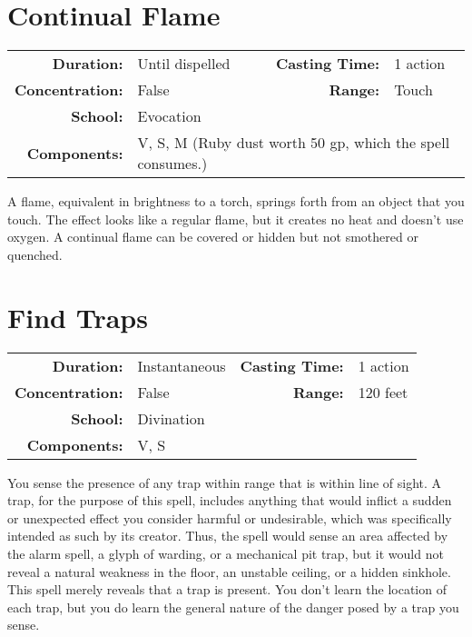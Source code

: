 \documentclass[a5paper, 12pt]{memoir}
\begin{document}
\newpage
\section*{Continual Flame}

{
\small\centering\vspace{-6pt}
\begin{tabular}{rlrl}
\toprule

\textbf{Duration:} & Until dispelled &
\textbf{Casting Time:} & 1 action \\
\textbf{Concentration:} & False &
\textbf{Range:} & Touch \\
\textbf{School:} & Evocation \\
\textbf{Components:} & \multicolumn{3}{p{0.7\textwidth}}{V, S, M (Ruby dust worth 50 gp, which the spell consumes.)}\\

\bottomrule
\end{tabular}
}

\vspace{1\baselineskip}\noindent A flame, equivalent in brightness to a torch, springs forth from an object that you touch. The effect looks like a regular flame, but it creates no heat and doesn't use oxygen. A continual flame can be covered or hidden but not smothered or quenched.

\newpage
\section*{Find Traps}

{
\small\centering\vspace{-6pt}
\begin{tabular}{rlrl}
\toprule

\textbf{Duration:} & Instantaneous &
\textbf{Casting Time:} & 1 action \\
\textbf{Concentration:} & False &
\textbf{Range:} & 120 feet \\
\textbf{School:} & Divination \\
\textbf{Components:} & \multicolumn{3}{p{0.7\textwidth}}{V, S}\\

\bottomrule
\end{tabular}
}

\vspace{1\baselineskip}\noindent You sense the presence of any trap within range that is within line of sight. A trap, for the purpose of this spell, includes anything that would inflict a sudden or unexpected effect you consider harmful or undesirable, which was specifically intended as such by its creator. Thus, the spell would sense an area affected by the alarm spell, a glyph of warding, or a mechanical pit trap, but it would not reveal a natural weakness in the floor, an unstable ceiling, or a hidden sinkhole. This spell merely reveals that a trap is present. You don't learn the location of each trap, but you do learn the general nature of the danger posed by a trap you sense.
\end{document}
